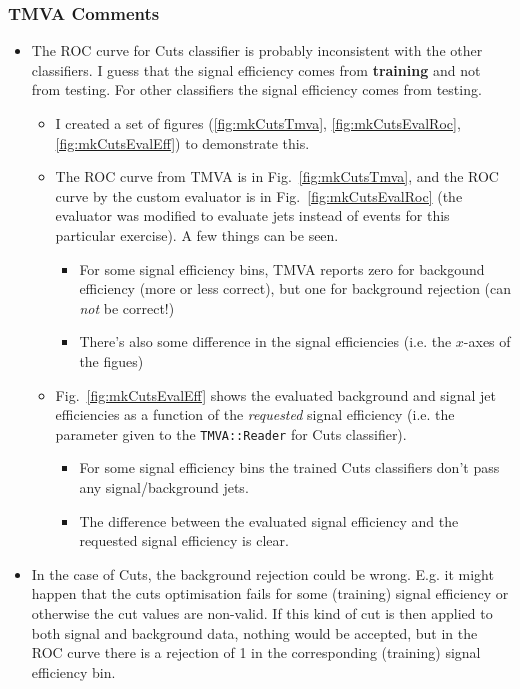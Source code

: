 \subsubsection{TMVA Comments}
\begin{itemize}
\item The ROC curve for Cuts classifier is probably inconsistent with
  the other classifiers. I guess that the signal efficiency comes from
  \textbf{training} and not from testing. For other classifiers the
  signal efficiency comes from testing.
  \begin{itemize}
  \item I created a set of figures (\ref{fig:mkCutsTmva},
    \ref{fig:mkCutsEvalRoc}, \ref{fig:mkCutsEvalEff}) to demonstrate
      this.
  \item The ROC curve from TMVA is in Fig.~\ref{fig:mkCutsTmva}, and
    the ROC curve by the custom evaluator is in
    Fig.~\ref{fig:mkCutsEvalRoc} (the evaluator was modified to
    evaluate jets instead of events for this particular exercise). A
    few things can be seen.
    \begin{itemize}
    \item For some signal efficiency bins, TMVA reports zero for
      backgound efficiency (more or less correct), but one for
      background rejection (can \emph{not} be correct!)
    \item There's also some difference in the signal efficiencies
      (i.e. the $x$-axes of the figues)
    \end{itemize}
  \item Fig.~\ref{fig:mkCutsEvalEff} shows the evaluated background
    and signal jet efficiencies as a function of the \emph{requested}
    signal efficiency (i.e. the parameter given to the
    \texttt{TMVA::Reader} for Cuts classifier).
    \begin{itemize}
    \item For some signal efficiency bins the trained Cuts classifiers
      don't pass any signal/background jets.
    \item The difference between the evaluated signal efficiency and
      the requested signal efficiency is clear.
    \end{itemize}
  \end{itemize}

\item In the case of Cuts, the background rejection could be wrong.
  E.g. it might happen that the cuts optimisation fails for some
  (training) signal efficiency or otherwise the cut values are
  non-valid. If this kind of cut is then applied to both signal and
  background data, nothing would be accepted, but in the ROC curve
  there is a rejection of 1 in the corresponding (training) signal
  efficiency bin.


\end{itemize}
